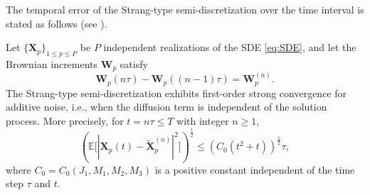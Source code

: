 \documentclass[review,onefignum,onetabnum]{siamart250211}
\begin{document}
The temporal error of the Strang-type semi-discretization over the time interval is stated as follows (see \textcite[p.~15-16]{milstein2004stochastic}).
\begin{lemma}
\label{lemma:temporal}
Let \(\{\mathbf{X}_p\}_{1 \leq p \leq P}\) be \(P\) independent realizations of the SDE \eqref{eq:SDE}, and let the Brownian increments \(\mathbf{W}_p\) satisfy
\begin{equation}
\mathbf{W}_p(n\tau) - \mathbf{W}_p((n-1)\tau) = \mathbf{W}_p^{(n)}. 
\end{equation}
The Strang-type semi-discretization exhibits first-order strong convergence for additive noise, i.e., when the diffusion term is independent of the solution process. More precisely, for \(t = n\tau \leq T\) with integer \(n\geq 1\),
\begin{equation}
\left(\mathbb{E}\bigl[ | \mathbf{X}_p(t) - \widetilde{\mathbf{X}}_p^{(n)} |^2 \bigr]\right)^\frac{1}{2}\leq \left( C_0 (t^2 +t)\right)^\frac{1}{2} \tau,   
\end{equation}
where \(C_0 = C_0(J_1,M_1,M_2,M_3)\) is a positive constant independent of the time step \(\tau\) and \(t\).
\end{lemma}
\end{document}
